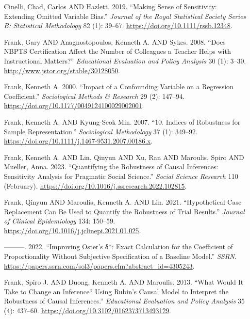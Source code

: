\documentclass[
]{article}
\newlength{\cslhangindent}
\newlength{\cslentryspacingunit} %
\newenvironment{CSLReferences}[2] %
 {%
  \setlength{\parindent}{0pt}
  \ifodd #1
  \let\oldpar\par
  \def\par{\hangindent=\cslhangindent\oldpar}
  \fi
  \setlength{\parskip}{#2\cslentryspacingunit}
 }%
 {}
\begin{document}
\hypertarget{refs}{}
\begin{CSLReferences}{1}{0}
\leavevmode{}%
Cinelli, Chad, Carlos AND Hazlett. 2019. {``{Making Sense of
Sensitivity: Extending Omitted Variable Bias}.''} \emph{Journal of the
Royal Statistical Society Series B: Statistical Methodology} 82 (1):
39--67. \url{https://doi.org/10.1111/rssb.12348}.

\leavevmode{}%
Frank, Gary AND Anagnostopoulos, Kenneth A. AND Sykes. 2008. {``Does
NBPTS Certification Affect the Number of Colleagues a Teacher Helps with
Instructional Matters?''} \emph{Educational Evaluation and Policy
Analysis} 30 (1): 3--30. \url{http://www.jstor.org/stable/30128050}.

\leavevmode{}%
Frank, Kenneth A. 2000. {``Impact of a {Confounding} {Variable} on a
{Regression} {Coefficient}.''} \emph{Sociological Methods \& Research}
29 (2): 147--94. \url{https://doi.org/10.1177/0049124100029002001}.

\leavevmode{}%
Frank, Kenneth A. AND Kyung-Seok Min. 2007. {``10. Indices of Robustness
for Sample Representation.''} \emph{Sociological Methodology} 37 (1):
349--92. \url{https://doi.org/10.1111/j.1467-9531.2007.00186.x}.

\leavevmode{}%
Frank, Kenneth A. AND Lin, Qinyun AND Xu, Ran AND Maroulis, Spiro AND
Mueller, Anna. 2023. {``Quantifying the Robustness of Causal Inferences:
Sensitivity Analysis for Pragmatic Social Science.''} \emph{Social
Science Research} 110 (February).
\url{https://doi.org/10.1016/j.ssresearch.2022.102815}.

\leavevmode{}%
Frank, Qinyun AND Maroulis, Kenneth A. AND Lin. 2021. {``Hypothetical
Case Replacement Can Be Used to Quantify the Robustness of Trial
Results.''} \emph{Journal of Clinical Epidemiology} 134: 150--59.
\url{https://doi.org/10.1016/j.jclinepi.2021.01.025}.

\leavevmode{}%
---------. 2022. {``Improving Oster's δ*: Exact Calculation for the
Coefficient of Proportionality Without Subjective Specification of a
Baseline Model.''} \emph{SSRN}.
\url{https://papers.ssrn.com/sol3/papers.cfm?abstract_id=4305243}.

\leavevmode{}%
Frank, Spiro J. AND Duong, Kenneth A. AND Maroulis. 2013. {``What
{Would} {It} {Take} to {Change} an {Inference}? {Using} {Rubin}'s
{Causal} {Model} to {Interpret} the {Robustness} of {Causal}
{Inferences}.''} \emph{Educational Evaluation and Policy Analysis} 35
(4): 437--60. \url{https://doi.org/10.3102/0162373713493129}.


\end{CSLReferences}
\end{document}
